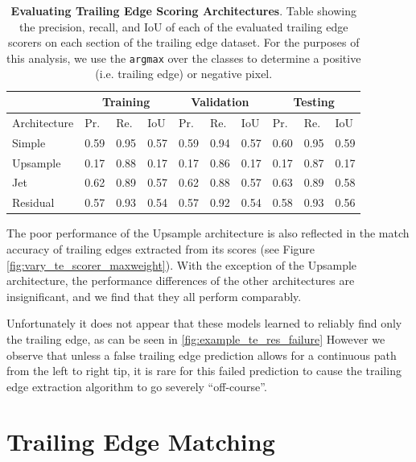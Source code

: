 \begin{table}[!htb]%
	\centering
	\resizebox{\linewidth}{!}
	{
		\begin{tabular} {l || l | l | l || l | l | l || l | l | l |}
		& \multicolumn{3}{c||}{Training} & \multicolumn{3}{c||}{Validation} & \multicolumn{3}{c|}{Testing} \\
		\hline
		Architecture & Pr. & Re. & IoU & Pr. & Re. & IoU & Pr. & Re. & IoU \\
		\hhline{=#===#===#===|}
		Simple & 0.59 & 0.95 & 0.57 & 0.59 & 0.94 & 0.57 & 0.60 & 0.95 & 0.59 \\
		\hline
		Upsample & 0.17 & 0.88 & 0.17 & 0.17 & 0.86 & 0.17 & 0.17 & 0.87 & 0.17 \\
		\hline
		Jet & 0.62 & 0.89 & 0.57 & 0.62 & 0.88 & 0.57 & 0.63 & 0.89 & 0.58 \\
		\hline
		Residual & 0.57 & 0.93 & 0.54 & 0.57 & 0.92 & 0.54 & 0.58 & 0.93 & 0.56 \\
		\hline
		\end{tabular}
	}
	\caption{\textbf{Evaluating Trailing Edge Scoring Architectures}. Table showing the precision, recall, and IoU of each of the evaluated trailing edge scorers on each section of the trailing edge dataset. For the purposes of this analysis, we use the \texttt{argmax} over the classes to determine a positive (i.e. trailing edge) or negative pixel.}
	\label{tab:te_score_full_analysis}
\end{table}

The poor performance of the Upsample architecture is also reflected in the match accuracy of trailing edges extracted from its scores (see Figure \ref{fig:vary_te_scorer_maxweight}).
With the exception of the Upsample architecture, the performance differences of the other architectures are insignificant, and we find that they all perform comparably.

Unfortunately it does not appear that these models learned to reliably find only the trailing edge, as can be seen in \ref{fig:example_te_res_failure}
However we observe that unless a false trailing edge prediction allows for a continuous path from the left to right tip, it is rare for this failed prediction to cause the trailing edge extraction algorithm to go severely ``off-course''.

\section{Trailing Edge Matching}

